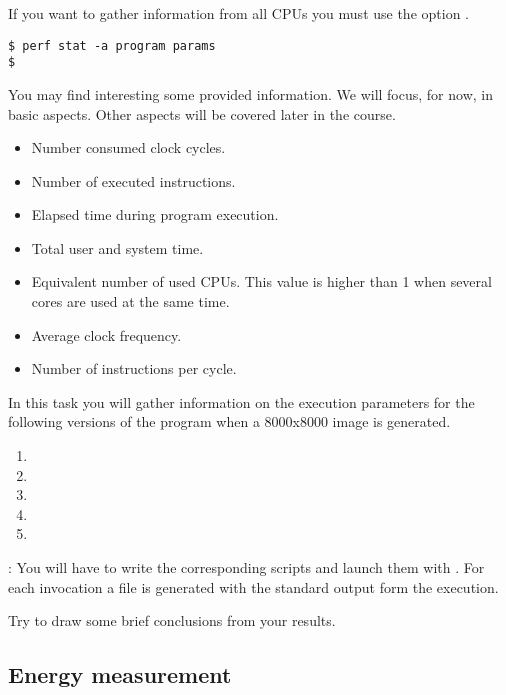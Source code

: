 If you want to gather information from all CPUs you must use the option .

\begin{lstlisting}[style=terminal]
$ perf stat -a program params
$
\end{lstlisting}

You may find interesting some provided information.
We will focus, for now, in basic aspects.
Other aspects will be covered later in the course.

\begin{itemize}
  \item Number consumed clock cycles.
  \item Number of executed instructions.
  \item Elapsed time during program execution.
  \item Total user and system time.
  \item Equivalent number of used CPUs. This value is higher than 1 when several cores are used
        at the same time.
  \item Average clock frequency.
  \item Number of instructions per cycle.
\end{itemize}

In this task you will gather information on the execution parameters for the 
following versions of the program when a 8000x8000 image is generated.

\begin{enumerate}
  \item {}
  \item {}
  \item {}
  \item {}
  \item {}
\end{enumerate}

: 
You will have to write the corresponding scripts and launch them with .
For each  invocation a  file is generated
with the standard output form the execution.

Try to draw some brief conclusions from your results.

\subsection{Energy measurement}


